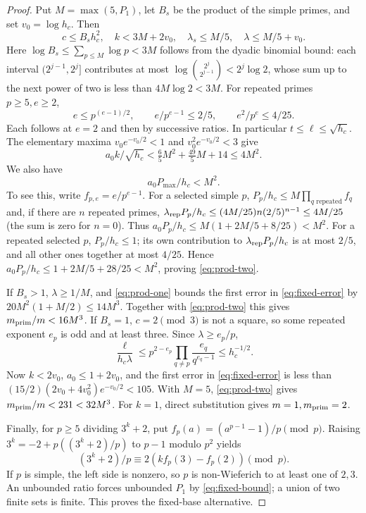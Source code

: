 \documentclass[11pt,a4paper]{article}
\theoremstyle{definition}\newtheorem{question}[theorem]{Question}
\theoremstyle{remark}\newtheorem{remark}[theorem]{Remark}
\begin{document}
\begin{proof}
Put $M=\max(5,P_1)$, let $B_s$ be the product of the simple primes,
and set $v_0=\log h_c$. Then
\[
 c\le B_sh_c^2,\quad k<3M+2v_0,\quad
 \lambda_s\le M/5,\quad\lambda\le M/5+v_0.
\]
Here $\log B_s\le\sum_{p\le M}\log p<3M$ follows from the dyadic
binomial bound: each interval $(2^{j-1},2^j]$ contributes at most
$\log\binom{2^j}{2^{j-1}}<2^j\log2$, whose sum up to the next
power of two is less than $4M\log2<3M$.
For repeated primes $p\ge5,e\ge2$,
\[
 e\le p^{(e-1)/2},\qquad e/p^{e-1}\le2/5,\qquad e^2/p^e\le4/25.
\]
Each follows at $e=2$ and then by successive ratios. In particular
$t\le\ell\le\sqrt{h_c}$. The elementary maxima
$v_0e^{-v_0/2}<1$ and $v_0^2e^{-v_0/2}<3$ give
\begin{equation}\label{eq:prod-one}
 a_0k/\sqrt{h_c}<\tfrac65M^2+\tfrac{49}5M+14\le4M^2.
\end{equation}
We also have
\begin{equation}\label{eq:prod-two}
 a_0P_{\max}/h_c<M^2.
\end{equation}
To see this, write $f_{p,e}=e/p^{e-1}$.
For a selected simple $p$, $P_p/h_c\le M\prod_{q\text{ repeated}}f_q$
and, if there are $n$ repeated primes,
$\lambda_{\rm rep}P_p/h_c\le(4M/25)n(2/5)^{n-1}\le4M/25$
(the sum is zero for $n=0$). Thus
$a_0P_p/h_c\le M(1+2M/5+8/25)<M^2$.
For a repeated selected $p$, $P_p/h_c\le1$; its own contribution
to $\lambda_{\rm rep}P_p/h_c$ is at most $2/5$, and all other
ones together at most $4/25$. Hence
$a_0P_p/h_c\le1+2M/5+28/25<M^2$, proving \eqref{eq:prod-two}.

If $B_s>1$, $\lambda\ge1/M$, and \eqref{eq:prod-one} bounds the
first error in \eqref{eq:fixed-error} by
$20M^2(1+M/2)\le14M^3$. Together with \eqref{eq:prod-two} this
gives $m_{\mathrm{prim}}/m<16M^3$.
If $B_s=1$, $c=2\pmod3$ is not a square, so some repeated
exponent $e_p$ is odd and at least three. Since $\lambda\ge e_p/p$,
\[
 \frac{\ell}{h_c\lambda}
 \le p^{2-e_p}\prod_{q\ne p}\frac{e_q}{q^{e_q-1}}
 \le h_c^{-1/2}.
\]
Now $k<2v_0$, $a_0\le1+2v_0$, and the first error in
\eqref{eq:fixed-error} is less than
$(15/2)(2v_0+4v_0^2)e^{-v_0/2}<105$.
With $M=5$, \eqref{eq:prod-two} gives $m_{\mathrm{prim}}/m<231<32M^3$.
For $k=1$, direct substitution gives $m=1,m_{\mathrm{prim}}=2$.

Finally, for $p\ge5$ dividing $3^k+2$, put
$f_p(a)=(a^{p-1}-1)/p\pmod p$.
Raising $3^k=-2+p((3^k+2)/p)$ to $p-1$ modulo $p^2$ yields
\[
 (3^k+2)/p\equiv2(k f_p(3)-f_p(2))\pmod p.
\]
If $p$ is simple, the left side is nonzero, so $p$ is non-Wieferich
to at least one of $2,3$. An unbounded ratio forces unbounded $P_1$
by \eqref{eq:fixed-bound}; a union of two finite sets is finite.
This proves the fixed-base alternative.
\end{proof}
\end{document}
